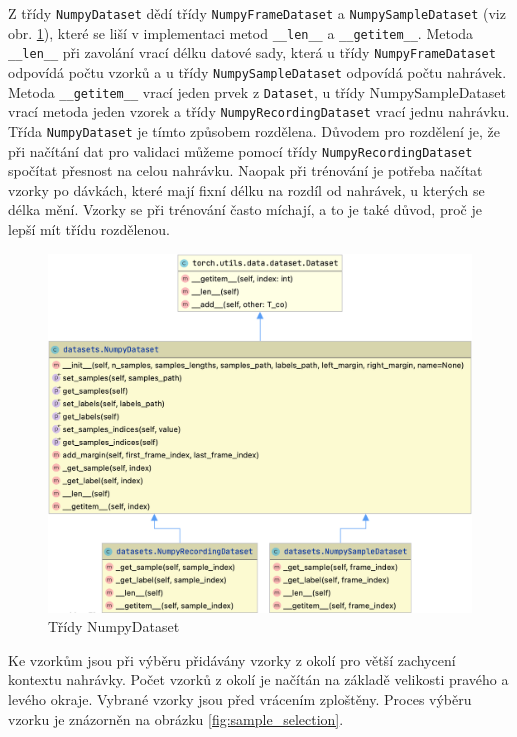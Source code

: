 \documentclass[FM,BP]{tulthesis}
\begin{document}
Z třídy \texttt{\mbox{NumpyDataset}} dědí třídy \texttt{\mbox{NumpyFrameDataset}} a \texttt{\mbox{NumpySampleDataset}} (viz obr. \mbox{\ref{fig:numpy_dataset}}), které se liší v implementaci metod \texttt{\_\_len\_\_} a \texttt{\_\_getitem\_\_}. Metoda \texttt{\_\_len\_\_} při zavolání vrací délku datové sady, která u třídy \texttt{\mbox{NumpyFrameDataset}} odpovídá počtu vzorků a u třídy \texttt{\mbox{NumpySampleDataset}} odpovídá počtu nahrávek. Metoda \texttt{\_\_getitem\_\_} vrací jeden prvek z \texttt{\mbox{Dataset}}, u třídy \mbox{NumpySampleDataset} vrací metoda jeden vzorek a třídy \texttt{\mbox{NumpyRecordingDataset}} vrací jednu nahrávku. Třída \texttt{\mbox{NumpyDataset}} je tímto způsobem rozdělena. Důvodem pro rozdělení je, že při načítání dat pro validaci můžeme pomocí třídy \texttt{\mbox{NumpyRecordingDataset}} spočítat přesnost na celou nahrávku. Naopak při trénování je potřeba načítat vzorky po dávkách, které mají fixní délku na rozdíl od nahrávek, u kterých se délka mění. Vzorky se při trénování často míchají, a to je také důvod, proč je lepší mít třídu rozdělenou.

\begin{figure}[ht]
\centerline{\includegraphics[scale=.25]{datasets.png}}
\caption{Třídy NumpyDataset}
\label{fig:numpy_dataset}
\end{figure}
\FloatBarrier

Ke vzorkům jsou při výběru přidávány vzorky z okolí pro větší zachycení kontextu nahrávky. Počet vzorků z okolí je načítán na základě velikosti pravého a levého okraje. Vybrané vzorky jsou před vrácením zploštěny. Proces výběru vzorku je znázorněn na obrázku \mbox{\ref{fig:sample_selection}}.
\end{document}

